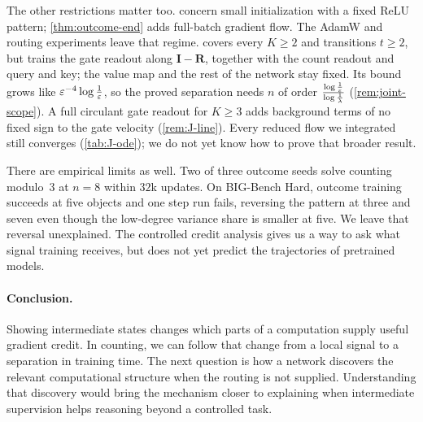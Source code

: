 The other restrictions matter too.  concern small initialization with a fixed ReLU pattern;
\cref{thm:outcome-end} adds full-batch gradient flow. The AdamW and routing experiments leave that regime.  covers
every $K\ge2$ and transitions $t\ge2$, but trains the gate readout along $\mathbf I-\mathbf R$, together with the count readout and
query and key; the value map and the rest of the network stay fixed. Its bound grows like $\varepsilon^{-4}\log\frac{1}{\varepsilon}$,
so the proved separation needs $n$ of order $\frac{\log\frac{1}{\varepsilon}}{\log\frac{1}{\lambda}}$ (\cref{rem:joint-scope}). A full
circulant gate readout for $K\ge3$ adds background terms of no fixed sign to the gate velocity (\cref{rem:J-line}). Every reduced
flow we integrated still converges (\cref{tab:J-ode}); we do not yet know how to prove that broader result.

There are empirical limits as well. Two of three outcome seeds solve counting modulo~$3$ at $n=8$ within $32$k updates.
On BIG-Bench Hard, outcome training succeeds at five objects and one step run fails, reversing the pattern at three and seven
even though the low-degree variance share is smaller at five. We leave that reversal unexplained. The controlled credit analysis
gives us a way to ask what signal training receives, but does not yet predict the trajectories of pretrained models.

\paragraph{Conclusion.} Showing intermediate states changes which parts of a computation supply useful gradient credit. In counting,
we can follow that change from a local signal to a separation in training time. The next question is how a network discovers the
relevant computational structure when the routing is not supplied. Understanding that discovery would bring the mechanism closer
to explaining when intermediate supervision helps reasoning beyond a controlled task.

